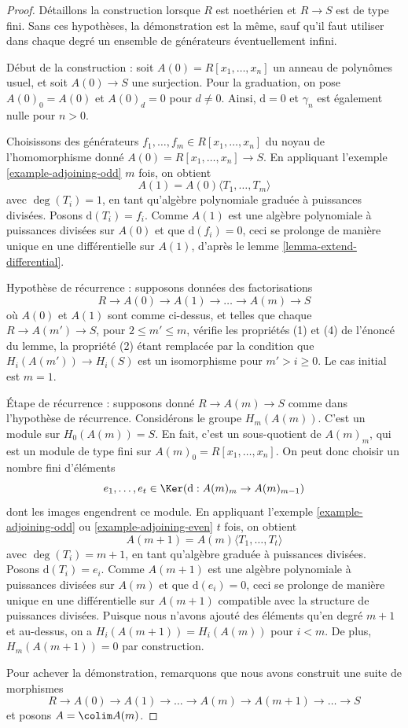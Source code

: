 \begin{proof}
Détaillons la construction lorsque $R$ est
noethérien et $R\to S$ est de type fini. Sans ces hypothèses, la démonstration
est la même, sauf qu'il faut utiliser dans chaque degré un
ensemble de générateurs éventuellement infini.

\medskip\noindent
Début de la construction : soit $A(0) = R[x_1, \ldots, x_n]$ un
anneau de polynômes usuel, et soit $A(0) \to S$ une surjection. Pour
la graduation, on pose $A(0)_0 = A(0)$ et $A(0)_d = 0$ pour $d \not = 0$.
Ainsi, $\text{d} = 0$ et $\gamma_n$ est également nulle pour $n > 0$.

\medskip\noindent
Choisissons des générateurs $f_1, \ldots, f_m \in R[x_1, \ldots, x_n]$
du noyau de l'homomorphisme donné $A(0) = R[x_1, \ldots, x_n] \to S$.
En appliquant l'exemple \ref{example-adjoining-odd} $m$ fois, on obtient
$$
A(1) = A(0)\langle T_1, \ldots, T_m\rangle
$$
avec $\deg(T_i) = 1$, en tant qu'algèbre polynomiale graduée à puissances
divisées. Posons $\text{d}(T_i) = f_i$. Comme $A(1)$ est une algèbre polynomiale à
puissances divisées sur $A(0)$ et que $\text{d}(f_i) = 0$,
ceci se prolonge de manière unique en une différentielle sur $A(1)$,
d'après le lemme \ref{lemma-extend-differential}.

\medskip\noindent
Hypothèse de récurrence : supposons données des factorisations
$$
R \to A(0) \to A(1) \to\ldots\to A(m) \to S
$$
où $A(0)$ et $A(1)$ sont comme ci-dessus, et telles que chaque $R \to A(m') \to S$,
pour $2 \leq m' \leq m$, vérifie les propriétés (1) et (4)
de l'énoncé du lemme, la propriété (2) étant remplacée par la condition que
$H_i(A(m')) \to H_i(S)$ est un isomorphisme pour
$m' > i \geq 0$. Le cas initial est $m = 1$.

\medskip\noindent
Étape de récurrence : supposons donné $R \to A(m) \to S$
comme dans l'hypothèse de récurrence. Considérons le
groupe $H_m(A(m))$. C'est un module sur $H_0(A(m)) = S$.
En fait, c'est un sous-quotient de $A(m)_m$, qui est un
module de type fini sur $A(m)_0 = R[x_1, \ldots, x_n]$.
On peut donc choisir un nombre fini d'éléments
$$
e_1, \ldots, e_t \in\Ker(\text{d} : A(m)_m \to A(m)_{m - 1})
$$
dont les images engendrent ce module. En appliquant
l'exemple \ref{example-adjoining-odd} ou
\ref{example-adjoining-even} $t$ fois, on obtient
$$
A(m + 1) = A(m)\langle T_1, \ldots, T_t\rangle
$$
avec $\deg(T_i) = m + 1$, en tant qu'algèbre graduée à puissances divisées. Posons
$\text{d}(T_i) = e_i$. Comme $A(m+1)$ est une algèbre polynomiale à
puissances divisées sur $A(m)$ et que $\text{d}(e_i) = 0$,
ceci se prolonge de manière unique en une différentielle sur $A(m + 1)$
compatible avec la structure de puissances divisées.
Puisque nous n'avons ajouté des éléments qu'en degré $m + 1$ et au-dessus,
on a $H_i(A(m + 1)) = H_i(A(m))$ pour $i < m$. De
plus, $H_m(A(m + 1)) = 0$ par construction.

\medskip\noindent
Pour achever la démonstration, remarquons que nous avons construit
une suite de morphismes
$$
R \to A(0) \to A(1) \to\ldots\to A(m) \to A(m + 1) \to\ldots\to S
$$
et posons $A = \colim A(m)$.
\end{proof}

